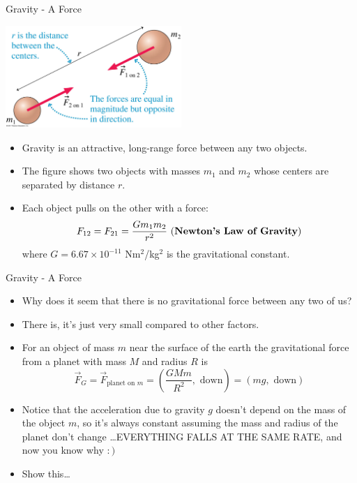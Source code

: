 \documentclass{beamer}
\begin{document}
\begin{frame}{Gravity - A Force}
\begin{center}
   \includegraphics[width=0.5\textwidth]{../figures/06_06_Figure.jpg}
\end{center}
\begin{itemize}
   \item Gravity is an attractive, long-range force between any two objects.
   \item The figure shows two objects with masses $m_1$ and $m_2$ whose centers are separated by distance $r$.
   \item Each object pulls on the other with a force:
   \begin{equation*}
      F_{12} = F_{21} = \frac{Gm_1m_2}{r^2} ~(\text{\bf Newton's Law of Gravity})
   \end{equation*}
   where $G = 6.67\times10^{-11}$ Nm$^2$/kg$^2$ is the gravitational constant.
\end{itemize}
\end{frame}

\begin{frame}{Gravity - A Force}
\begin{itemize}
   \item Why does it seem that there is no gravitational force between any two of us?
   \item<2-> There is, it's just very small compared to other factors.
   \item<3-> For an object of mass $m$ near the surface of the earth the gravitational force from a planet with mass $M$ and radius $R$ is
   \begin{equation*}
      \vec{F}_G = \vec{F}_{\text{planet on }m} = \left(\frac{GMm}{R^2},\text{ down}\right) = (mg,\text{ down})
   \end{equation*}
   \item<4-> Notice that the acceleration due to gravity $g$ doesn't depend on the mass of the object $m$, so it's always constant assuming the mass and radius of the planet don't change \ldots EVERYTHING FALLS AT THE SAME RATE, and now you know why $:)$
   \item<5-> Show this\ldots {}
\end{itemize}
\end{frame}
\end{document}
